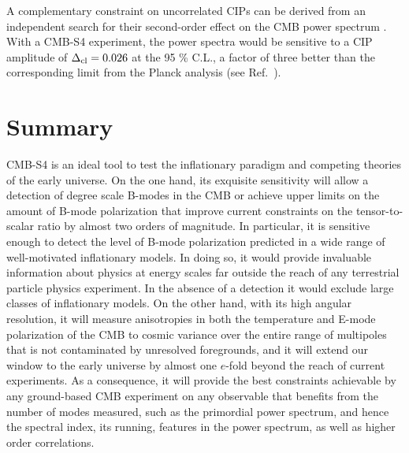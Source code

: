 A complementary constraint on uncorrelated CIPs can be derived from an independent search for their second-order effect on the CMB power spectrum \cite{Munoz:2015fdv}. With a CMB-S4 experiment, the power spectra would be sensitive to a CIP amplitude of $\Delta_{\rm cl} = 0.026$ at the 95 \% C.L., a factor of three better than the corresponding limit from the Planck analysis (see Ref.~\cite{Munoz:2015fdv}).






\section{Summary}
CMB-S4 is an ideal tool to test the inflationary paradigm and competing theories of the early universe. On the one hand, its exquisite sensitivity will allow a detection of degree scale B-modes in the CMB or achieve upper limits on the amount of B-mode polarization that improve current constraints on the tensor-to-scalar ratio by almost two orders of magnitude. In particular, it is sensitive enough to detect the level of B-mode polarization predicted in a wide range of well-motivated inflationary models. In doing so, it would provide invaluable information about physics at energy scales far outside the reach of any terrestrial particle physics experiment. In the absence of a detection it would exclude large classes of inflationary models. On the other hand, with its high angular resolution, it will measure anisotropies in both the temperature and E-mode polarization of the CMB to cosmic variance over the entire range of multipoles that is not contaminated by unresolved foregrounds, and it will extend our window to the early universe by almost one $e$-fold beyond the reach of current experiments. As a consequence, it will provide the best constraints achievable by any ground-based CMB experiment on any observable that benefits from the number of modes measured, such as the primordial power spectrum, and hence the spectral index, its running, features in the power spectrum, as well as higher order correlations.


 
